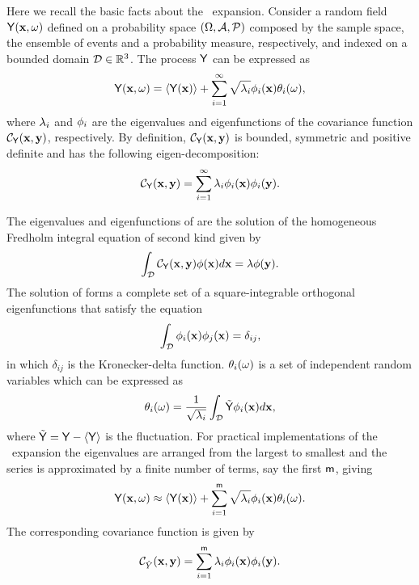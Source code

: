Here we recall the basic facts about the \KL\ expansion. 
Consider a random field $\mathsf{Y}(\mathbf{x},\omega)$ defined on a probability space $(\Omega,\mathcal{A},\mathcal{P})$ composed by the sample space, the ensemble of events and a probability measure, respectively, and indexed on a bounded domain $\mathcal{D} \in \mathbb{R}^{3}$.
The process $\mathsf{Y}$ can be expressed as 
%
\begin{equation}
  \mathsf{Y}(\mathbf{x},\omega) = \langle {\mathsf{Y}(\mathbf{x})} \rangle +\sum_{i=1}^{\infty}\sqrt{\lambda_{i}} \phi_{i}(\mathbf{x})
\theta_{i}(\omega),
\label{kl}
\end{equation}
%
\noindent where $\lambda_{i}$ and $\phi_{i}$ are the eigenvalues and eigenfunctions of the covariance function $\mathcal{C}_{\mathsf{Y}}(\mathbf{x}, \mathbf{y})$, respectively. 
By definition, $\mathcal{C}_{\mathsf{Y}}(\mathbf{x}, \mathbf{y})$ is bounded, symmetric and positive definite and has the following eigen-decomposition:
%
\begin{equation*}
  \mathcal{C}_{\mathsf{Y}}(\mathbf{x}, \mathbf{y}) = \sum_{i=1}^{\infty} \lambda_{i}\phi_{i}(\mathbf{x})\phi_{i}(\mathbf{y}).
\label{klcov}
\end{equation*}
%

The eigenvalues and eigenfunctions of  are the solution of the homogeneous Fredholm integral equation of second kind given by
%
\begin{equation}
  \int_{\mathcal{D}} \mathcal{C}_{\mathsf{Y}}(\mathbf{x}, \mathbf{y}) \phi(\mathbf{x}) d\mathbf{x} = \lambda\phi(\mathbf{y}).
\label{fred}
\end{equation}
%
\noindent The solution of  forms a complete set of a square-integrable
orthogonal eigenfunctions that satisfy the equation
%
\begin{equation*}
  \int_{\mathcal{D}} \phi_{i}(\mathbf{x}) \phi_{j}(\mathbf{x})=\delta_{ij},
\label{ortho}
\end{equation*}
%
\noindent in which $\delta_{ij}$ is the Kronecker-delta function.
$\theta_{i}(\omega)$ is a set of independent random variables which
can be expressed as
%
\begin{equation*}
  \theta_{i}(\omega) = \displaystyle
\frac{1}{\sqrt{\lambda_{i}}}\int_{\mathcal{D}}\tilde{\mathsf{Y}}\phi_{i}(\mathbf{x}) d\mathbf{x},
\end{equation*}
%
\noindent where $\tilde{\mathsf{Y}}=\mathsf{Y}-\langle {\mathsf{Y}} \rangle$ is the fluctuation.
For practical implementations of the \kl\ expansion the eigenvalues are arranged from the largest to smallest and the series is approximated by a finite number of terms, say the first $\mathsf{m}$, giving
%
\begin{equation}
  \mathsf{Y}\!\left(\mathbf{x},\omega\right) \approx \langle {\mathsf{Y}(\mathbf{x})} \rangle +\sum_{i=1}^{\mathsf{m}}\sqrt{\lambda_{i}} \phi_{i}(\mathbf{x})
\theta_{i}(\omega).
\label{klM}
\end{equation}
%
The corresponding covariance function is given by 
%
\begin{equation*}
  \mathcal{C}_{\hat{Y}}(\mathbf{x}, \mathbf{y}) = \sum_{i=1}^{\mathsf{m}} \lambda_{i}\phi_{i}(\mathbf{x})\phi_{i}(\mathbf{y}).
\label{klcovM}
\end{equation*}
%

